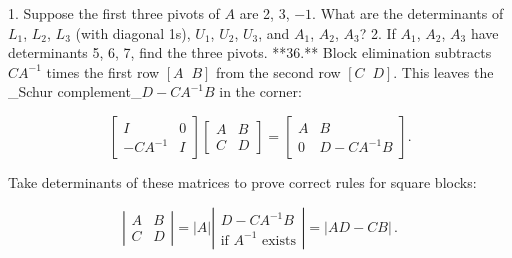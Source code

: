 1. Suppose the first three pivots of \(A\) are 2, 3, \(-1\). What are the determinants of \(L_{1}\), \(L_{2}\), \(L_{3}\) (with diagonal 1s), \(U_{1}\), \(U_{2}\), \(U_{3}\), and \(A_{1}\), \(A_{2}\), \(A_{3}\)?
2. If \(A_{1}\), \(A_{2}\), \(A_{3}\) have determinants 5, 6, 7, find the three pivots.
**36.** Block elimination subtracts \(CA^{-1}\) times the first row \([A\;\;B]\) from the second row \([C\;\;D]\). This leaves the _Schur complement_\(D-CA^{-1}B\) in the corner:

\[\left[\begin{matrix}I&0\\ -CA^{-1}&I\end{matrix}\right]\left[\begin{matrix}A&B\\ C&D\end{matrix}\right]=\left[\begin{matrix}A&B\\ 0&D-CA^{-1}B\end{matrix}\right].\]

Take determinants of these matrices to prove correct rules for square blocks:

\[\left|\begin{matrix}A&B\\ C&D\end{matrix}\right|=|A|\left|\begin{matrix}D-CA^{-1}B\\ \text{if }A^{-1}\text{ exists}\end{matrix}\right|=|AD-CB|\,.\]